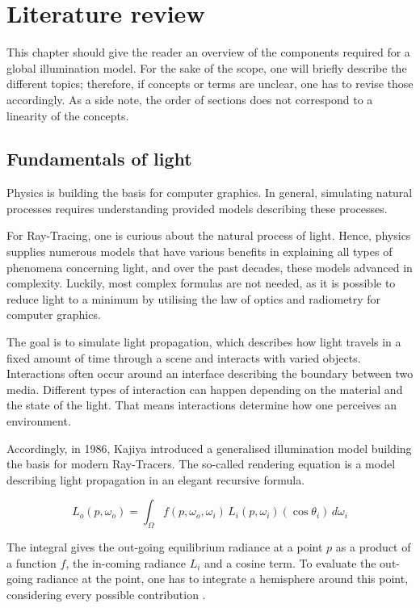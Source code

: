 \chapter{Literature review}

This chapter should give the reader an overview of the components required for a global illumination model.
For the sake of the scope, one will briefly describe the different topics; therefore, if concepts or terms are unclear, one has to revise those accordingly.
As a side note, the order of sections does not correspond to a linearity of the concepts.

\section{Fundamentals of light}

Physics is building the basis for computer graphics.
In general, simulating natural processes requires understanding provided models describing these processes.

For Ray-Tracing, one is curious about the natural process of light.
Hence, physics supplies numerous models that have various benefits in explaining all types of phenomena concerning light, and over the past decades, these models advanced in complexity. 
Luckily, most complex formulas are not needed, as it is possible to reduce light to a minimum by utilising the law of optics and radiometry for computer graphics.

The goal is to simulate light propagation, which describes how light travels in a fixed amount of time through a scene and interacts with varied objects.
Interactions often occur around an interface describing the boundary between two media.
Different types of interaction can happen depending on the material and the state of the light.
That means interactions determine how one perceives an environment.
\cite{duin_beleuchtungsalgorithmen_nodate}

Accordingly, in 1986, Kajiya introduced a generalised illumination model building the basis for modern Ray-Tracers.
The so-called rendering equation is a model describing light propagation in an elegant recursive formula.

$$
L_o(p,\omega_o)=\int_{\Omega}f(p,\omega_o,\omega_i)\,L_i(p,\omega_i)\left(\cos\theta_i\right)\,d\omega_i
$$

The integral gives the out-going equilibrium radiance at a point $p$ as a product of a function $f$, the in-coming radiance $L_i$ and a cosine term.
To evaluate the out-going radiance at the point, one has to integrate a hemisphere around this point, considering every possible contribution \cite{kajiya_rendering_1986}.

